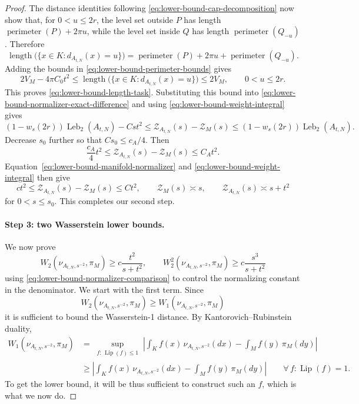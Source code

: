 \documentclass{article}
\newcommand{\Leb}{\operatorname{Leb}}
\numberwithin{equation}{section}
\begin{document}
\begin{proof}
The distance identities following
\eqref{eq:lower-bound-cap-decomposition} now show that, for
$0<u\le2r$, the level set outside $P$ has length
$\operatorname{perimeter}(P)+2\pi u$, while the level set inside $Q$ has
length $\operatorname{perimeter}(Q_{-u})$. Therefore
\[
 \operatorname{length}
 \bigl(\{x\in K:d_{A_{t,N}}(x)=u\}\bigr)
 =\operatorname{perimeter}(P)+2\pi u
  +\operatorname{perimeter}(Q_{-u}).
\]
Adding the bounds in \eqref{eq:lower-bound-perimeter-bounds} gives
\[
 2V_M-4\pi C_0t^2
 \le \operatorname{length}
 \bigl(\{x\in K:d_{A_{t,N}}(x)=u\}\bigr)
 \le2V_M,
 \qquad 0<u\le2r.
\]
This proves \eqref{eq:lower-bound-length-task}. Substituting this bound into
\eqref{eq:lower-bound-normalizer-exact-difference} and using
\eqref{eq:lower-bound-weight-integral} gives
\[
 (1-w_s(2r))\Leb_2(A_{t,N})-Cst^2
 \le\mathcal Z_{A_{t,N}}(s)-\mathcal Z_M(s)
 \le(1-w_s(2r))\Leb_2(A_{t,N}).
\]
Decrease $s_0$ further so that $Cs_0\le c_A/4$. Then
\[
 \frac{c_A}{4}t^2
 \le\mathcal Z_{A_{t,N}}(s)-\mathcal Z_M(s)
 \le C_At^2.
\]
Equation~\eqref{eq:lower-bound-manifold-normalizer} and
\eqref{eq:lower-bound-weight-integral} then give
\begin{equation}
 ct^2\le\mathcal Z_{A_{t,N}}(s)-\mathcal Z_M(s)\le Ct^2,
 \qquad
 \mathcal Z_M(s)\asymp s,
 \qquad
 \mathcal Z_{A_{t,N}}(s)\asymp s+t^2
\label{eq:lower-bound-normalizer-comparison}
\end{equation}
for $0<s\le s_0$. This completes our second step.

\paragraph{Step 3: two Wasserstein lower bounds.}
We now prove
\[
 W_2(\nu_{A_{t,N},s^{-2}},\pi_M)
 \ge c\frac{t^2}{s+t^2},
 \qquad
 W_2^2(\nu_{A_{t,N},s^{-2}},\pi_M)
 \ge c\frac{s^3}{s+t^2}
\]
using 
\eqref{eq:lower-bound-normalizer-comparison} to control the normalizing
constant in the denominator. We start with the first term. Since
\[
  W_2(\nu_{A_{t,N},s^{-2}},\pi_M)
 \ge W_1(\nu_{A_{t,N},s^{-2}},\pi_M)
 \]
it is sufficient to bound the Wasserstein-1 distance. By
Kantorovich--Rubinstein duality,
\begin{align*}
  W_1(\nu_{A_{t,N},s^{-2}},\pi_M)
 & =\sup_{\substack{f:\, \operatorname{Lip}(f)\le1}}
 \left|
 \int_K f(x)\,\nu_{A_{t,N},s^{-2}}(dx)
 -\int_M f(y)\,\pi_M(dy)
 \right|\\
 &\geq \left|
 \int_K f(x)\,\nu_{A_{t,N},s^{-2}}(dx)
 -\int_M f(y)\,\pi_M(dy)
 \right|\qquad \forall\, f:\operatorname{Lip}(f)=1.
\end{align*}
To get the lower bound, it will be thus sufficient to construct such an $f$, which is what we now do.


\end{proof}
\end{document}
